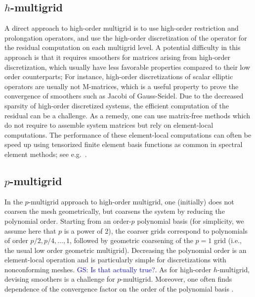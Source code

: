 \documentclass[smallcondensed,final]{svjour3}     %
\newcommand{\gsnote}[1]{\textcolor{blue}{GS: #1}}
\begin{document}
\subsection{$h$-multigrid}\label{subsec:h}
A direct approach to high-order multigrid is to use high-order
restriction and prolongation operators, and use the high-order
discretization of the operator for the residual computation on each
multigrid level.  A potential difficulty in this approach is that it
requires smoothers for matrices arising from high-order
discretization, which usually have less favorable properties compared
to their low order counterparts; For instance, high-order
discretizations of scalar elliptic operators are usually not
M-matrices, which is a useful property to prove the convergence of
smoothers such as Jacobi of Gauss-Seidel.  Due to the decreased
sparsity of high-order discretized systems, the efficient computation
of the residual can be a challenge. As a remedy, one can use
matrix-free methods which do not require to assemble system matrices
but rely on element-local computations. The performance of these
element-local computations can often be speed up using tensorized
finite element basis functions as common in spectral element methods;
see e.g.~\cite{DevilleFischerMund02}.


\subsection{$p$-multigrid}\label{subsec:p}
In the $p$-multigrid approach to high-order multigrid, one (initially)
does not coarsen the mesh geometrically, but coarsens the system by
reducing the polynomial order. Starting from an order-$p$ polynomial
basis (for simplicity, we assume here that $p$ is a power of 2), the
coarser grids correspond to polynomials of order $p/2, p/4,\ldots,1$,
followed by geometric coarsening of the $p=1$ grid (i.e., the usual
low order geometric multigrid). Decreasing the polynomial order is an
element-local operation and is particularly simple for discretizations
with nonconforming meshes. \gsnote{Is that actually true?}. As for
high-order $h$-multigrid, devising smoothers is a challenge for
$p$-multigrid.  Moreover, one often finds dependence of the
convergence factor on the order of the polynomial basis \cite{MadayMunoz89}.
\end{document}
